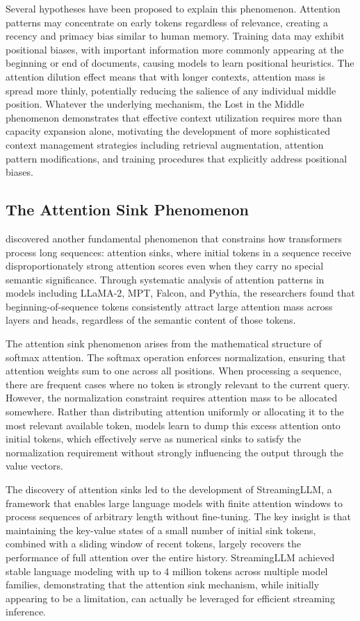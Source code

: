 \documentclass[11pt,letterpaper]{article}
\begin{document}
Several hypotheses have been proposed to explain this phenomenon. Attention patterns may concentrate on early tokens regardless of relevance, creating a recency and primacy bias similar to human memory. Training data may exhibit positional biases, with important information more commonly appearing at the beginning or end of documents, causing models to learn positional heuristics. The attention dilution effect means that with longer contexts, attention mass is spread more thinly, potentially reducing the salience of any individual middle position. Whatever the underlying mechanism, the Lost in the Middle phenomenon demonstrates that effective context utilization requires more than capacity expansion alone, motivating the development of more sophisticated context management strategies including retrieval augmentation, attention pattern modifications, and training procedures that explicitly address positional biases.

\subsection{The Attention Sink Phenomenon}

\cite{xiao2024efficient} discovered another fundamental phenomenon that constrains how transformers process long sequences: attention sinks, where initial tokens in a sequence receive disproportionately strong attention scores even when they carry no special semantic significance. Through systematic analysis of attention patterns in models including LLaMA-2, MPT, Falcon, and Pythia, the researchers found that beginning-of-sequence tokens consistently attract large attention mass across layers and heads, regardless of the semantic content of those tokens.

The attention sink phenomenon arises from the mathematical structure of softmax attention. The softmax operation enforces normalization, ensuring that attention weights sum to one across all positions. When processing a sequence, there are frequent cases where no token is strongly relevant to the current query. However, the normalization constraint requires attention mass to be allocated somewhere. Rather than distributing attention uniformly or allocating it to the most relevant available token, models learn to dump this excess attention onto initial tokens, which effectively serve as numerical sinks to satisfy the normalization requirement without strongly influencing the output through the value vectors.

The discovery of attention sinks led to the development of StreamingLLM, a framework that enables large language models with finite attention windows to process sequences of arbitrary length without fine-tuning. The key insight is that maintaining the key-value states of a small number of initial sink tokens, combined with a sliding window of recent tokens, largely recovers the performance of full attention over the entire history. StreamingLLM achieved stable language modeling with up to 4 million tokens across multiple model families, demonstrating that the attention sink mechanism, while initially appearing to be a limitation, can actually be leveraged for efficient streaming inference.
\end{document}
